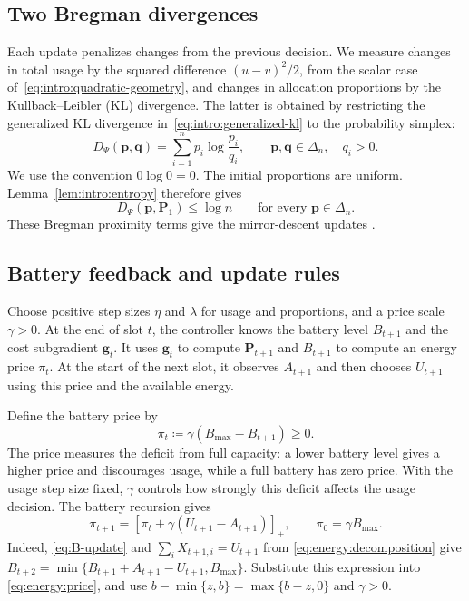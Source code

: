 \subsection{Two Bregman divergences}

Each update penalizes changes from the previous decision. We measure
changes in total usage by the squared difference $(u-v)^2/2$, from the
scalar case of~\eqref{eq:intro:quadratic-geometry}, and changes in allocation
proportions by the Kullback--Leibler (KL) divergence. The latter is obtained
by restricting the generalized KL divergence
in~\eqref{eq:intro:generalized-kl} to the probability simplex:
\begin{equation}\label{eq:energy:entropy-divergence}
D_\Psi(\mathbf p,\mathbf q)=\sum_{i=1}^n p_i\log\frac{p_i}{q_i},
\qquad \mathbf p,\mathbf q\in\Delta_n,\quad q_i>0.
\end{equation}
We use the convention $0\log0=0$. The initial proportions are uniform.
Lemma~\ref{lem:intro:entropy} therefore gives
\[
D_\Psi(\mathbf p,\mathbf P_1)\leq\log n
\qquad\text{for every }\mathbf p\in\Delta_n.
\]
These Bregman proximity terms give the mirror-descent updates
\cite{nemirovskij1983problem,BECK2003167,hazan2010extracting,cesa2006prediction}.

\subsection{Battery feedback and update rules}

Choose positive step sizes $\eta$ and $\lambda$ for usage and proportions,
and a price scale $\gamma>0$. At the end of slot $t$, the controller knows
the battery level $B_{t+1}$ and the cost subgradient $\mathbf g_t$. It uses
$\mathbf g_t$ to compute $\mathbf P_{t+1}$ and $B_{t+1}$ to compute an energy
price $\pi_t$. At the start of the next slot, it observes $A_{t+1}$ and then
chooses $U_{t+1}$ using this price and the available energy.

Define the battery price by
\begin{equation}\label{eq:energy:price}
\pi_t\coloneqq\gamma(B_{\mathrm{max}}-B_{t+1})\geq0.
\end{equation}
The price measures the deficit from full capacity: a lower battery level
gives a higher price and discourages usage, while a full battery has zero
price. With the usage step size fixed, $\gamma$ controls how strongly this
deficit affects the usage decision.
The battery recursion gives
\begin{equation}\label{eq:energy:price-update}
\pi_{t+1}=[\pi_t+\gamma(U_{t+1}-A_{t+1})]_+,
\qquad \pi_0=\gamma B_{\mathrm{max}}.
\end{equation}
Indeed, \eqref{eq:B-update} and
$\sum_iX_{t+1,i}=U_{t+1}$ from \eqref{eq:energy:decomposition} give
$B_{t+2}=\min\{B_{t+1}+A_{t+1}-U_{t+1},B_{\mathrm{max}}\}$.
Substitute this expression into \eqref{eq:energy:price}, and use
$b-\min\{z,b\}=\max\{b-z,0\}$ and $\gamma>0$.


